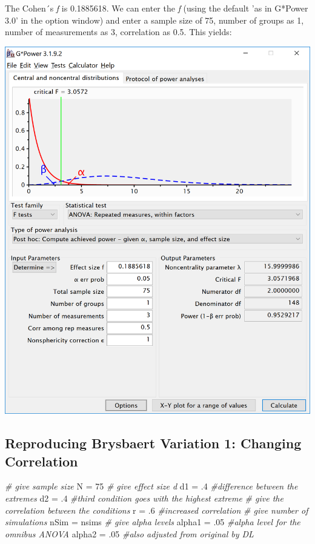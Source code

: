 \documentclass[]{book}
\newenvironment{Shaded}{\begin{snugshade}}{\end{snugshade}}
\newcommand{\CommentTok}[1]{\textcolor[rgb]{0.56,0.35,0.01}{\textit{#1}}}
\newcommand{\DecValTok}[1]{\textcolor[rgb]{0.00,0.00,0.81}{#1}}
\newcommand{\FloatTok}[1]{\textcolor[rgb]{0.00,0.00,0.81}{#1}}
\newcommand{\NormalTok}[1]{#1}
\newcommand{\StringTok}[1]{\textcolor[rgb]{0.31,0.60,0.02}{#1}}
\begin{document}
The Cohen´s \emph{f} is 0.1885618. We can enter the \emph{f} (using the default 'as in G*Power 3.0' in the option window) and enter a sample size of 75, number of groups as 1, number of measurements as 3, correlation as 0.5. This yields:

\includegraphics{screenshots/gpower_3.png}

\hypertarget{reproducing-brysbaert-variation-1-changing-correlation}{%
\subsection{Reproducing Brysbaert Variation 1: Changing Correlation}\label{reproducing-brysbaert-variation-1-changing-correlation}}

\begin{Shaded}
\begin{Highlighting}[]
\CommentTok{# give sample size}
\NormalTok{N =}\StringTok{ }\DecValTok{75}
\CommentTok{# give effect size d}
\NormalTok{d1 =}\StringTok{ }\FloatTok{.4} \CommentTok{#difference between the extremes}
\NormalTok{d2 =}\StringTok{ }\FloatTok{.4} \CommentTok{#third condition goes with the highest extreme}
\CommentTok{# give the correlation between the conditions}
\NormalTok{r =}\StringTok{ }\FloatTok{.6} \CommentTok{#increased correlation}
\CommentTok{# give number of simulations}
\NormalTok{nSim =}\StringTok{ }\NormalTok{nsims}
\CommentTok{# give alpha levels}
\NormalTok{alpha1 =}\StringTok{ }\FloatTok{.05} \CommentTok{#alpha level for the omnibus ANOVA}
\NormalTok{alpha2 =}\StringTok{ }\FloatTok{.05} \CommentTok{#also adjusted from original by DL}
\end{Highlighting}
\end{Shaded}
\end{document}
